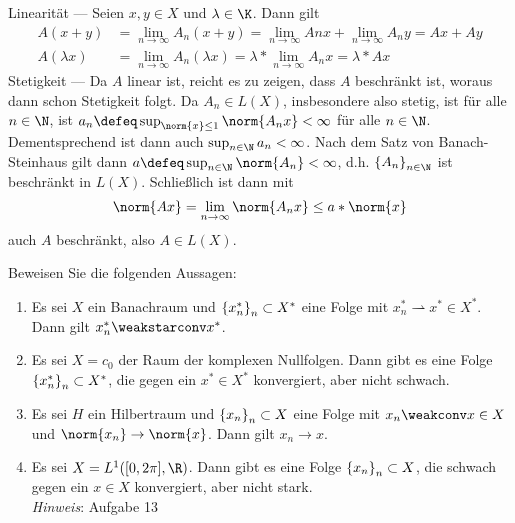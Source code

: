 \begin{exercisePage}
\begin{enumerate}[label=(zu \alph*), leftmargin=*]
 		Linearität --- Seien $x,y \in X$ und $\lambda \in \K$. Dann gilt
		\begin{equation*}
			\begin{aligned}
			A(x+y) &= \lim_{n \to \infty} A_n (x+y) = \lim_{n \to \infty} An x + \lim_{n \to \infty} A_n y = Ax + Ay \\
			A(\lambda x) &= \lim_{n \to \infty}A_n(\lambda x) = \lambda * \lim_{n \to \infty} A_n x = \lambda * Ax
			\end{aligned}
		\end{equation*}
		Stetigkeit --- Da $A$ linear ist, reicht es zu zeigen, dass $A$ beschränkt ist, woraus dann schon Stetigkeit folgt. Da $A_n \in L(X)$, insbesondere also stetig, ist für alle $n \in \N$, ist $a_n \defeq \sup_{\norm{x} \le 1} \norm{A_n x} < \infty$ für alle $n \in \N$. Dementsprechend ist dann auch $\sup_{n \in \N} a_n < \infty$. Nach dem Satz von Banach-Steinhaus gilt dann $a \defeq \sup_{n \in \N} \norm{A_n} < \infty$, d.h. $\folge{A_n}{n \in \N}$ ist beschränkt in $L(X)$. Schließlich ist dann mit
		\begin{equation*}
			\norm{Ax} = \lim_{n \to \infty} \norm{A_n x} \le a * \norm{x}
		\end{equation*}
		auch $A$ beschränkt, also $A \in L(X)$.
 	\end{enumerate}
 
 	\begin{exercise}
 		Beweisen Sie die folgenden Aussagen:
 		\begin{enumerate}
 			\item Es sei $X$ ein Banachraum und $\left\{ x_n^\ast \right\}_{n} \subset X^\ast$ eine Folge mit $x_n^\ast \rightharpoonup x^\ast \in X^\ast$. Dann gilt $x_n^\ast \weakstarconv x^\ast$.
 			\item Es sei $X = c_0$ der Raum der komplexen Nullfolgen. Dann gibt es eine Folge $\left\{ x_n^\ast \right\}_{n} \subset X^\ast$, die \schwachstern gegen ein $x^\ast \in X^\ast$ konvergiert, aber nicht schwach.
 			\item Es sei $H$ ein Hilbertraum und $\left\{ x_n \right\}_{n} \subset X$ eine Folge mit $x_n \weakconv x \in X$ und $\norm{x_n} \to \norm{x}$. Dann gilt $x_n \to x$.
 			\item Es sei $X = L^1([0,2\pi], \R)$. Dann gibt es eine Folge $\left\{ x_n \right\}_{n} \subset X$, die schwach gegen ein $x \in X$ konvergiert, aber nicht stark. \\
 			\textit{Hinweis}: Aufgabe 13
 		\end{enumerate}
 	\end{exercise}
 

\end{exercisePage}
